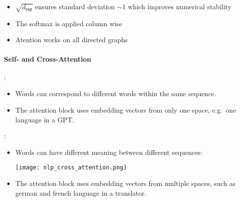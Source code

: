 \newpar{}
\begin{itemize}
    \item $\sqrt{d_{\mathsf{rep}}}$ ensures standard deviation $\sim 1$ which improves numerical stability
    \item The softmax is applied column wise
    \item Atention works on all directed graphs
\end{itemize}

\paragraph{Self- and Cross-Attention}

:

\begin{itemize}
    \item Words can correspond to different words within the same sequence.
    \item The attention block uses embedding vectors from only one space, e.g.\ one language in a GPT.
\end{itemize}

\newpar{}
:

\begin{itemize}
    \item Words can have different meaning between different sequences:
          \begin{center}
              \texttt{[image: nlp\_cross\_attention.png]}
          \end{center}
    \item The attention block uses embedding vectors from multiple spaces, such as german and french language in a translator.
\end{itemize}

\newpar{}

